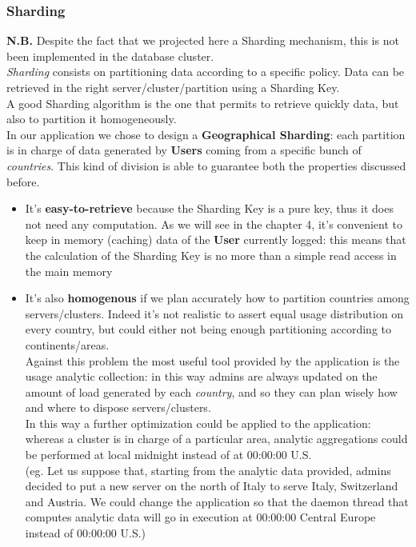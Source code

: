 \subsubsection{Sharding}
\textbf{N.B.} Despite the fact that we projected here a Sharding mechanism, this is not been implemented in the database cluster. \medskip \\
\textit{Sharding} consists on partitioning data according to a specific policy. Data can be retrieved in the right server/cluster/partition using a Sharding Key.\\
A good Sharding algorithm is the one that permits to retrieve quickly data, but also to partition it homogeneously.\\
In our application we chose to design a \textbf{Geographical Sharding}: each partition is in charge of data generated by \textbf{Users} coming from a specific bunch of \textit{countries}. This kind of division is able to guarantee both the properties discussed before.
\begin{itemize}
	\item It’s \textbf{easy-to-retrieve} because the Sharding Key is a pure key, thus it does not need any computation. As we will see in the chapter 4, it’s convenient to keep in memory (caching) data of the \textbf{User} currently logged: this means that the calculation of the Sharding Key is no more than a simple read access in the main memory
	\item It’s also \textbf{homogenous} if we plan accurately how to partition countries among servers/clusters. Indeed it’s not realistic to assert equal usage distribution on every country, but could either not being enough partitioning according to continents/areas.\\
	Against this problem the most useful tool provided by the application is the usage analytic collection: in this way admins are always updated on the amount of load generated by each \textit{country}, and so they can plan wisely how and where to dispose servers/clusters.\\
	In this way a further optimization could be applied to the application: whereas a cluster is in charge of a particular area, analytic aggregations could be performed  at local midnight instead of at 00:00:00 U.S.\\
	(eg. Let us suppose that, starting from the analytic data provided, admins decided to put a new server on the north of Italy to serve Italy, Switzerland and Austria. We could change the application so that the daemon thread that computes analytic data will go in execution at 00:00:00 Central Europe instead of 00:00:00 U.S.)
\end{itemize}
